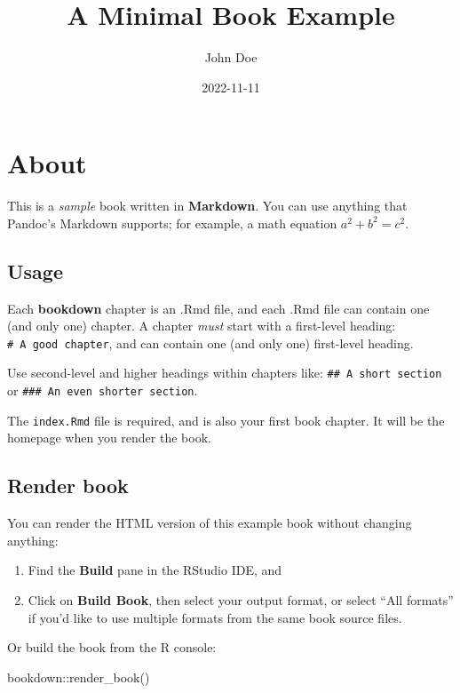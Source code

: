 \documentclass[
  a4paper,
]{book}
\title{A Minimal Book Example}
\author{John Doe}
\date{2022-11-11}
\newenvironment{Shaded}{\begin{snugshade}}{\end{snugshade}}
\newcommand{\FunctionTok}[1]{\textcolor[rgb]{0.00,0.00,0.00}{#1}}
\newcommand{\NormalTok}[1]{#1}
\newcommand{\SpecialCharTok}[1]{\textcolor[rgb]{0.00,0.00,0.00}{#1}}
\theoremstyle{definition}
\theoremstyle{definition}
\theoremstyle{definition}
\theoremstyle{definition}
\theoremstyle{remark}
\begin{document}
\maketitle

{
\setcounter{tocdepth}{1}
\tableofcontents
}
\hypertarget{about}{%
\chapter{About}\label{about}}

This is a \emph{sample} book written in \textbf{Markdown}. You can use anything that Pandoc's Markdown supports; for example, a math equation \(a^2 + b^2 = c^2\).

\hypertarget{usage}{%
\section{Usage}\label{usage}}

Each \textbf{bookdown} chapter is an .Rmd file, and each .Rmd file can contain one (and only one) chapter. A chapter \emph{must} start with a first-level heading: \texttt{\#\ A\ good\ chapter}, and can contain one (and only one) first-level heading.

Use second-level and higher headings within chapters like: \texttt{\#\#\ A\ short\ section} or \texttt{\#\#\#\ An\ even\ shorter\ section}.

The \texttt{index.Rmd} file is required, and is also your first book chapter. It will be the homepage when you render the book.

\hypertarget{render-book}{%
\section{Render book}\label{render-book}}

You can render the HTML version of this example book without changing anything:

\begin{enumerate}
\def\labelenumi{\arabic{enumi}.}
\item
  Find the \textbf{Build} pane in the RStudio IDE, and
\item
  Click on \textbf{Build Book}, then select your output format, or select ``All formats'' if you'd like to use multiple formats from the same book source files.
\end{enumerate}

Or build the book from the R console:

\begin{Shaded}
\begin{Highlighting}[]
\NormalTok{bookdown}\SpecialCharTok{::}\FunctionTok{render\_book}\NormalTok{()}
\end{Highlighting}
\end{Shaded}
\end{document}
